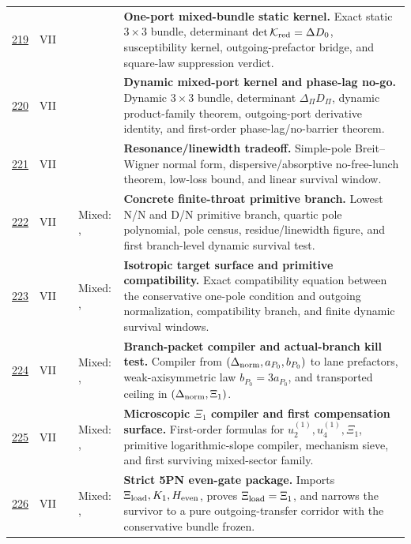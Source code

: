 {\begin{longtable}{@{}L{0.055\textwidth}L{0.075\textwidth}L{0.145\textwidth}L{0.235\textwidth}L{0.43\textwidth}@{}}
\addlinespace
\hyperref[stage:219]{219} & VII &  & \StatusExactClosure{} & \textbf{One-port mixed-bundle static kernel.} Exact static \(3\times3\) bundle, determinant \(\det\mathcal K_{\rm red}=\Delta D_0\), susceptibility kernel, outgoing-prefactor bridge, and square-law suppression verdict. \\
\addlinespace
\hyperref[stage:220]{220} & VII &  & \StatusExactClosure{} & \textbf{Dynamic mixed-port kernel and phase-lag no-go.} Dynamic \(3\times3\) bundle, determinant \(\Delta_\Pi D_\Pi\), dynamic product-family theorem, outgoing-port derivative identity, and first-order phase-lag/no-barrier theorem. \\
\addlinespace
\hyperref[stage:221]{221} & VII &  & \StatusExactClosure{} & \textbf{Resonance/linewidth tradeoff.} Simple-pole Breit--Wigner normal form, dispersive/absorptive no-free-lunch theorem, low-loss bound, and linear survival window. \\
\addlinespace
\hyperref[stage:222]{222} & VII &  & Mixed: \StatusExactClosure{}, \StatusNumerical{} & \textbf{Concrete finite-throat primitive branch.} Lowest N/N and D/N primitive branch, quartic pole polynomial, pole census, residue/linewidth figure, and first branch-level dynamic survival test. \\
\addlinespace
\hyperref[stage:223]{223} & VII &  & Mixed: \StatusExactClosure{}, \StatusNumerical{} & \textbf{Isotropic target surface and primitive compatibility.} Exact compatibility equation between the conservative one-pole condition and outgoing normalization, compatibility branch, and finite dynamic survival windows. \\
\addlinespace
\hyperref[stage:224]{224} & VII &  & Mixed: \StatusExactClosure{}, \StatusOpen{} & \textbf{Branch-packet compiler and actual-branch kill test.} Compiler from \((\Delta_{\rm norm},a_{P_0},b_{P_0})\) to lane prefactors, weak-axisymmetric law \(b_{P_0}=3a_{P_0}\), and transported ceiling in \((\Delta_{\rm norm},\Xi_1)\). \\
\addlinespace
\hyperref[stage:225]{225} & VII &  & Mixed: \StatusExactClosure{}, \StatusOpen{} & \textbf{Microscopic \(\Xi_1\) compiler and first compensation surface.} First-order formulas for \(u_2^{(1)},u_4^{(1)},\Xi_1\), primitive logarithmic-slope compiler, mechanism sieve, and first surviving mixed-sector family. \\
\addlinespace
\hyperref[stage:226]{226} & VII &  & Mixed: \StatusExactClosure{}, \StatusReduced{} & \textbf{Strict 5PN even-gate package.} Imports \(\Xi_{\rm load},K_1,H_{\rm even}\), proves \(\Xi_{\rm load}=\Xi_1\), and narrows the survivor to a pure outgoing-transfer corridor with the conservative bundle frozen. \\

\end{longtable}}
